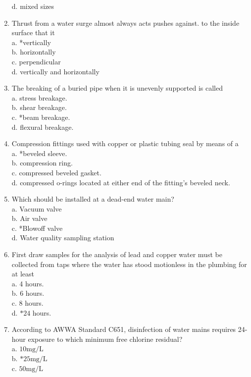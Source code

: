 \begin{enumerate}[1.]
d. mixed sizes\\
\item Thrust from a water surge almost always acts pushes against. to the inside surface that it\\
a. *vertically\\
b. horizontally\\
c. perpendicular\\
d. vertically and horizontally\\
\item The breaking of a buried pipe when it is unevenly supported is called\\
a. stress breakage.\\
b. shear breakage.\\
c. *beam breakage.\\
d. flexural breakage.\\
\item Compression fittings used with copper or plastic tubing seal by means of a\\
a. *beveled sleeve.\\
b. compression ring.\\
c. compressed beveled gasket.\\
d. compressed o-rings located at either end of the fitting's beveled neck.\\
\item Which should be installed at a dead-end water main?\\
a. Vacuum valve\\
b. Air valve\\
c. *Blowoff valve\\
d. Water quality sampling station\\
\item First draw samples for the analysis of lead and copper water must be collected from taps where the water has stood motionless in the plumbing for at least\\
a. 4 hours.\\
b. 6 hours.\\
c. 8 hours.\\
d. $* 24$ hours.\\
\item According to AWWA Standard C651, disinfection of water mains requires 24-hour exposure to which minimum free chlorine residual?\\
a. $10 \mathrm{mg} / \mathrm{L}$\\
b. $* 25 \mathrm{mg} / \mathrm{L}$\\
c. $50 \mathrm{mg} / \mathrm{L}$\\

\end{enumerate}
